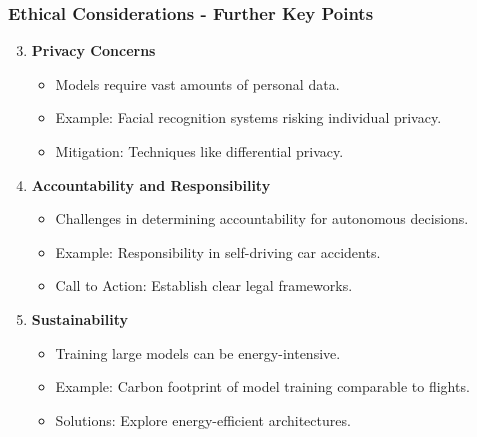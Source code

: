 \documentclass[aspectratio=169]{beamer}
\begin{document}
\begin{frame}[fragile]
    \frametitle{Ethical Considerations - Further Key Points}
    \begin{enumerate}
        \setcounter{enumi}{2}
        \item \textbf{Privacy Concerns}
            \begin{itemize}
                \item Models require vast amounts of personal data.
                \item Example: Facial recognition systems risking individual privacy.
                \item Mitigation: Techniques like differential privacy.
            \end{itemize}
        \item \textbf{Accountability and Responsibility}
            \begin{itemize}
                \item Challenges in determining accountability for autonomous decisions.
                \item Example: Responsibility in self-driving car accidents.
                \item Call to Action: Establish clear legal frameworks.
            \end{itemize}
        \item \textbf{Sustainability}
            \begin{itemize}
                \item Training large models can be energy-intensive.
                \item Example: Carbon footprint of model training comparable to flights.
                \item Solutions: Explore energy-efficient architectures.
            \end{itemize}
    \end{enumerate}
\end{frame}
\end{document}

